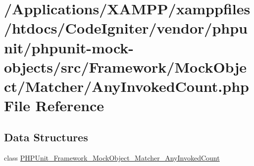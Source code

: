 \hypertarget{_any_invoked_count_8php}{}\section{/\+Applications/\+X\+A\+M\+P\+P/xamppfiles/htdocs/\+Code\+Igniter/vendor/phpunit/phpunit-\/mock-\/objects/src/\+Framework/\+Mock\+Object/\+Matcher/\+Any\+Invoked\+Count.php File Reference}
\label{_any_invoked_count_8php}
\subsection*{Data Structures}
\begin{DoxyCompactItemize}
\item 
class \mbox{\hyperlink{class_p_h_p_unit___framework___mock_object___matcher___any_invoked_count}{P\+H\+P\+Unit\+\_\+\+Framework\+\_\+\+Mock\+Object\+\_\+\+Matcher\+\_\+\+Any\+Invoked\+Count}}
\end{DoxyCompactItemize}
